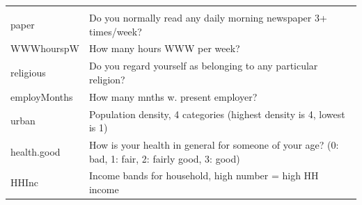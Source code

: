 \documentclass[]{article}
\begin{document}
\begin{longtable}[]{@{}ll@{}}
\begin{minipage}[t]{0.83\columnwidth}
\end{minipage}\tabularnewline
\begin{minipage}[t]{0.11\columnwidth}\raggedright
paper\strut
\end{minipage} & \begin{minipage}[t]{0.83\columnwidth}\raggedright
Do you normally read any daily morning newspaper 3+ times/week?\strut
\end{minipage}\tabularnewline
\begin{minipage}[t]{0.11\columnwidth}\raggedright
WWWhourspW\strut
\end{minipage} & \begin{minipage}[t]{0.83\columnwidth}\raggedright
How many hours WWW per week?\strut
\end{minipage}\tabularnewline
\begin{minipage}[t]{0.11\columnwidth}\raggedright
religious\strut
\end{minipage} & \begin{minipage}[t]{0.83\columnwidth}\raggedright
Do you regard yourself as belonging to any particular religion?\strut
\end{minipage}\tabularnewline
\begin{minipage}[t]{0.11\columnwidth}\raggedright
employMonths\strut
\end{minipage} & \begin{minipage}[t]{0.83\columnwidth}\raggedright
How many mnths w. present employer?\strut
\end{minipage}\tabularnewline
\begin{minipage}[t]{0.11\columnwidth}\raggedright
urban\strut
\end{minipage} & \begin{minipage}[t]{0.83\columnwidth}\raggedright
Population density, 4 categories (highest density is 4, lowest is 1)\strut
\end{minipage}\tabularnewline
\begin{minipage}[t]{0.11\columnwidth}\raggedright
health.good\strut
\end{minipage} & \begin{minipage}[t]{0.83\columnwidth}\raggedright
How is your health in general for someone of your age? (0: bad, 1: fair, 2: fairly good, 3: good)\strut
\end{minipage}\tabularnewline
\begin{minipage}[t]{0.11\columnwidth}\raggedright
HHInc\strut
\end{minipage} & \begin{minipage}[t]{0.83\columnwidth}\raggedright
Income bands for household, high number = high HH income\strut
\end{minipage}\tabularnewline
\bottomrule
\end{longtable}
\end{document}
